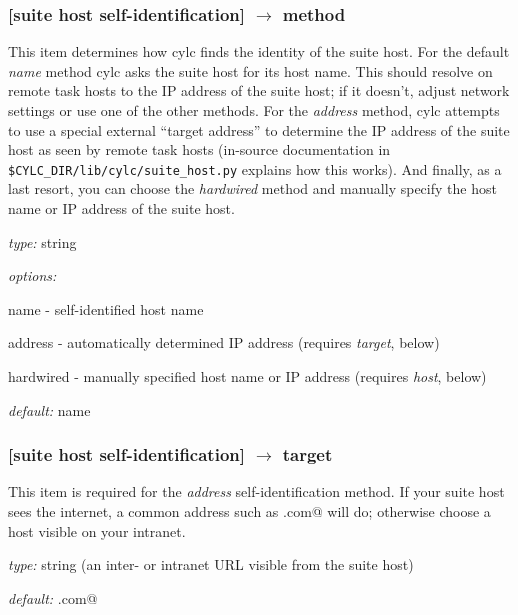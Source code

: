 \subsubsection[method]{[suite host self-identification] $\rightarrow$ method }

This item determines how cylc finds the identity of the suite host. For
the default {\em name} method cylc asks the suite host for its host
name. This should resolve on remote task hosts to the IP address of the
suite host; if it doesn't, adjust network settings or use one of the
other methods. For the {\em address} method, cylc attempts to use a
special external ``target address'' to determine the IP address of the
suite host as seen by remote task hosts (in-source documentation in
\lstinline=$CYLC_DIR/lib/cylc/suite_host.py= explains how this works).
And finally, as a last resort, you can choose the {\em hardwired} method
and manually specify the host name or IP address of the suite host.

\begin{myitemize}
\item {\em type:} string
\item {\em options:} 
\begin{myitemize}
    \item name - self-identified host name
    \item address - automatically determined IP address (requires {\em target}, below)
    \item hardwired - manually specified host name or IP address (requires {\em host}, below)
\end{myitemize}
\item {\em default:} name
\end{myitemize}

\subsubsection[target]{[suite host self-identification] $\rightarrow$ target }

This item is required for the {\em address} self-identification method.
If your suite host sees the internet, a common address such as
\lstinline@google.com@ will do; otherwise choose a host visible on your
intranet.
\begin{myitemize}
\item {\em type:} string (an inter- or intranet URL visible from the suite host)
\item {\em default:} \lstinline@google.com@
\end{myitemize}


